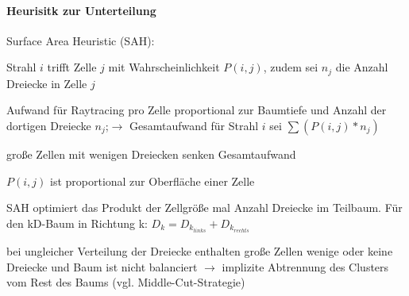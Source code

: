 \documentclass[landscape]{article}
\begin{document}
\begin{multicols}{3}
  \paragraph*{Heurisitk zur Unterteilung}
  \begin{itemize*}
    \item Surface Area Heuristic (SAH):
    \begin{itemize*}
      \item Strahl $i$ trifft Zelle $j$ mit Wahrscheinlichkeit $P(i,j)$, zudem sei $n_j$ die Anzahl Dreiecke in Zelle $j$
      \item Aufwand für Raytracing pro Zelle proportional zur Baumtiefe und Anzahl der dortigen Dreiecke $n_j$;$\rightarrow$ Gesamtaufwand für Strahl $i$ sei  $\sum(P(i,j)*n_j)$
    \end{itemize*}
    \item große Zellen mit wenigen Dreiecken senken Gesamtaufwand
      \item $P(i,j)$ ist proportional zur Oberfläche einer Zelle
      \item SAH optimiert das Produkt der Zellgröße mal Anzahl Dreiecke im Teilbaum. Für den kD-Baum in Richtung k: $D_k = D_{k_{links}} + D_{k_{rechts}}$
    \item bei ungleicher Verteilung der Dreiecke enthalten große Zellen wenige oder keine Dreiecke und Baum ist nicht balanciert $\rightarrow$ implizite Abtrennung des Clusters vom Rest des Baums (vgl. Middle-Cut-Strategie)
  \end{itemize*}
  

\end{multicols}
\end{document}

